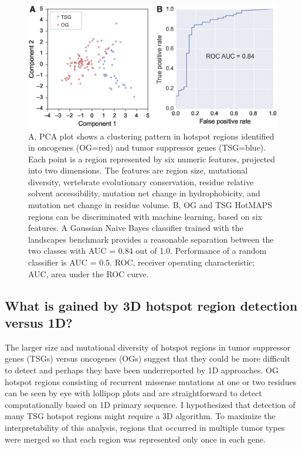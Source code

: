 \begin{figure}
  \centering
  \makeatletter
  \let\@currsize\normalsize
  \includegraphics[width=0.9\linewidth]{figures/chapter5/pca.jpg}
  \caption[HotMAPS regions have different characteristic features in OGs and TSGs.]{A, PCA plot shows a clustering pattern in hotspot regions identified in oncogenes (OG=red) and tumor suppressor genes (TSG=blue). Each point is a region represented by six numeric features, projected into two dimensions. The features are region size, mutational diversity, vertebrate evolutionary conservation, residue relative solvent accessibility, mutation net change in hydrophobicity, and mutation net change in residue volume. B, OG and TSG HotMAPS regions can be discriminated with machine learning, based on six features. A Gaussian Naive Bayes classifier trained with the landscapes benchmark provides a reasonable separation between the two classes with AUC = 0.84 out of 1.0. Performance of a random classifier is AUC = 0.5. ROC, receiver operating characteristic; AUC, area under the ROC curve.}
  \label{fig:hotmaps_pca}
\end{figure}

\subsection{What is gained by 3D hotspot region detection versus 1D?}

The larger size and mutational diversity of hotspot regions in tumor suppressor genes (TSGs) versus oncogenes (OGs) suggest that they could be more difficult to detect and perhaps they have been underreported by 1D approaches. OG hotspot regions consisting of recurrent missense mutations at one or two residues can be seen by eye with lollipop plots and are straightforward to detect computationally based on 1D primary sequence. I hypothesized that detection of many TSG hotspot regions might require a 3D algorithm. To maximize the interpretability of this analysis, regions that occurred in multiple tumor types were merged so that each region was represented only once in each gene.

